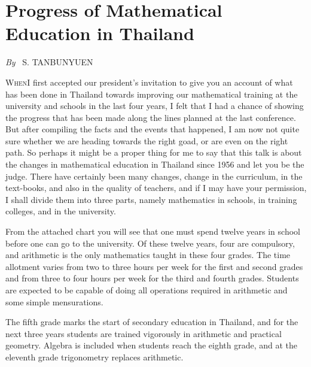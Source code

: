 \chapter{Progress of Mathematical Education in Thailand}

\begin{center}
{\em By}~ S. TANBUNYUEN
\end{center}
\medskip

\setcounter{pageoriginal}{150}
\textsc{When}\pageoriginale I first accepted our president's invitation to give you an account of what has been done in Thailand towards improving our mathematical training at the university and schools in the last four years, I felt that I had a chance of showing the progress that has been made along the lines planned at the last conference. But after compiling the facts and the events that happened, I am now not quite sure whether we are heading towards the right goad, or are even on the right path. So perhaps it might be a proper thing for me to say that this talk is about the changes in mathematical education in Thailand since 1956 and let you be the judge. There have certainly been many changes, change in the curriculum, in the text-books, and also in the quality of teachers, and if I may have your permission, I shall divide them into three parts, namely mathematics in schools, in training colleges, and in the university.

From the attached chart you will see that one must spend twelve years in school before one can go to the university. Of these twelve years, four are compulsory, and arithmetic is the only mathematics taught in these four grades. The time allotment varies from two to three hours per week for the first and second grades and from three to four hours per week for the third and fourth grades. Students are expected to be capable of doing all operations required in arithmetic and some simple mensurations.

The fifth grade marks the start of secondary education in Thailand, and for the next three years students are trained vigorously in arithmetic and practical geometry. Algebra is included when students reach the eighth grade, and at the eleventh grade trigonometry replaces arithmetic.

